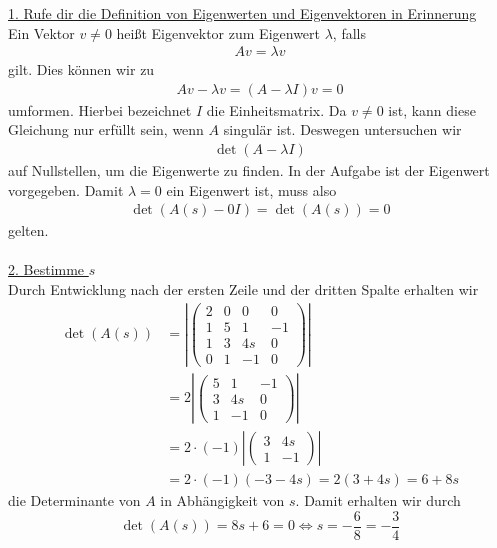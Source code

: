 \underline{1. Rufe dir die Definition von Eigenwerten und Eigenvektoren in Erinnerung}\\
Ein Vektor $v \neq 0$ heißt Eigenvektor zum Eigenwert $\lambda$,
falls
\begin{align*}
A v = \lambda v
\end{align*}
gilt.
Dies können wir zu 
\begin{align*}
A v - \lambda v = (A-\lambda I)v = 0
\end{align*}
umformen. 
Hierbei bezeichnet $I$ die Einheitsmatrix.
Da $v \neq 0$ ist, kann diese Gleichung nur erfüllt sein, wenn $A$ singulär ist.
Deswegen untersuchen wir
\begin{align*}
\det(A - \lambda I) 
\end{align*}
auf Nullstellen, um die Eigenwerte zu finden.
In der Aufgabe ist der Eigenwert vorgegeben. 
Damit $ \lambda = 0 $ ein Eigenwert ist, muss also
\begin{align*}
\det(A(s) - 0 I) = \det(A(s)) = 0
\end{align*}
gelten.\\
\\
\underline{2. Bestimme $s$}\\
Durch Entwicklung nach der ersten Zeile und der dritten Spalte erhalten wir
\begin{equation*}
\begin{split}
\det(A(s))&=
\left| 
\begin{pmatrix}
2 & 0 &0 & 0 \\
1 & 5 & 1  & -1\\
1 & 3 & 4s & 0 \\
0 & 1 & -1 & 0
\end{pmatrix}
\right|\\
&=
2 
\left| 
\begin{pmatrix}
 5 & 1  & -1\\
 3 & 4s & 0 \\
 1 & -1 & 0
\end{pmatrix}
\right|\\
&= 
2 \cdot (-1) 
\left| 
\begin{pmatrix}
  3 & 4s  \\
 1 & -1 
\end{pmatrix}
\right|\\
&= 2 \cdot(-1) ( -3 - 4 s)
= 2( 3 + 4s) 
= 6 + 8s 
\end{split}
\end{equation*}
die Determinante von $A$ in Abhängigkeit von $s$.
Damit erhalten wir durch
\begin{equation*}
\det(A(s)) = 8s +6 = 0
\Leftrightarrow
s = -\frac{6}{8} = -\frac{3}{4}
\end{equation*}
